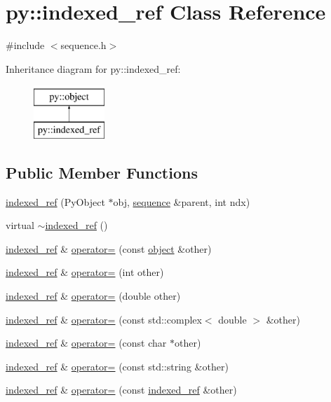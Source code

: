 \hypertarget{classpy_1_1indexed__ref}{}\section{py\+:\+:indexed\+\_\+ref Class Reference}
\label{classpy_1_1indexed__ref}


{\ttfamily \#include $<$sequence.\+h$>$}

Inheritance diagram for py\+:\+:indexed\+\_\+ref\+:\begin{figure}[H]
\begin{center}
\leavevmode
\includegraphics[height=2.000000cm]{classpy_1_1indexed__ref}
\end{center}
\end{figure}
\subsection*{Public Member Functions}
\begin{DoxyCompactItemize}
\item 
\hyperlink{classpy_1_1indexed__ref_a0e212d79038dc1d061c6a9a03625777a}{indexed\+\_\+ref} (Py\+Object $\ast$obj, \hyperlink{classpy_1_1sequence}{sequence} \&parent, int ndx)
\item 
virtual \hyperlink{classpy_1_1indexed__ref_a9e72fbbfe69e50ce027d0f106263e826}{$\sim$indexed\+\_\+ref} ()
\item 
\hyperlink{classpy_1_1indexed__ref}{indexed\+\_\+ref} \& \hyperlink{classpy_1_1indexed__ref_a8c9f2150c80bd6e2f011635a765e6f24}{operator=} (const \hyperlink{classpy_1_1object}{object} \&other)
\item 
\hyperlink{classpy_1_1indexed__ref}{indexed\+\_\+ref} \& \hyperlink{classpy_1_1indexed__ref_a8f61bc230599e73ff33548926134bb01}{operator=} (int other)
\item 
\hyperlink{classpy_1_1indexed__ref}{indexed\+\_\+ref} \& \hyperlink{classpy_1_1indexed__ref_a75b9e1441ec8e577cad04c6284dff32d}{operator=} (double other)
\item 
\hyperlink{classpy_1_1indexed__ref}{indexed\+\_\+ref} \& \hyperlink{classpy_1_1indexed__ref_ae2783af78020d49db2137356b66b25c3}{operator=} (const std\+::complex$<$ double $>$ \&other)
\item 
\hyperlink{classpy_1_1indexed__ref}{indexed\+\_\+ref} \& \hyperlink{classpy_1_1indexed__ref_a9e8d9c8a3f8b85b21d5e0bd4d390a25c}{operator=} (const char $\ast$other)
\item 
\hyperlink{classpy_1_1indexed__ref}{indexed\+\_\+ref} \& \hyperlink{classpy_1_1indexed__ref_ac46173b959b145c35c643639203ada25}{operator=} (const std\+::string \&other)
\item 
\hyperlink{classpy_1_1indexed__ref}{indexed\+\_\+ref} \& \hyperlink{classpy_1_1indexed__ref_a9238c4f04a22822fce4decfca88b778d}{operator=} (const \hyperlink{classpy_1_1indexed__ref}{indexed\+\_\+ref} \&other)
\end{DoxyCompactItemize}
